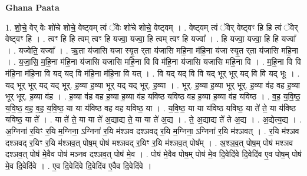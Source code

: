 \documentclass[17pt]{extarticle}
\begin{document}
\textbf{Ghana Paata } \newline

1. शो॒चे॒ वेर् वेः शो॑चे शोचे॒ वेष्ट्वम् त्वं ॅवेः शो॑चे शोचे॒ वेष्ट्वम् । . वेष्ट्वम् त्वं ॅवेर् वेष्ट्वꣳ हि हि त्वं ॅवेर् वेष्ट्वꣳ हि । . त्वꣳ हि हि त्वम् त्वꣳ हि यज्वा॒ यज्वा॒ हि त्वम् त्वꣳ हि यज्वा᳚ । . हि यज्वा॒ यज्वा॒ हि हि यज्वा᳚ । . यज्वेति॒ यज्वा᳚ । . ऋ॒ता य॑जासि यजा स्यृ॒त र्‌ता य॑जासि महि॒ना म॑हि॒ना य॑जा स्यृ॒त र्‌ता य॑जासि महि॒ना । . य॒जा॒सि॒ म॒हि॒ना म॑हि॒ना य॑जासि यजासि महि॒ना वि वि म॑हि॒ना य॑जासि यजासि महि॒ना वि । . म॒हि॒ना वि वि म॑हि॒ना म॑हि॒ना वि यद् यद् वि म॑हि॒ना म॑हि॒ना वि यत् । . वि यद् यद् वि वि यद् भूर् भूर् यद् वि वि यद् भूः । . यद् भूर् भूर् यद् यद् भूर्. ह॒व्या ह॒व्या भूर् यद् यद् भूर्. ह॒व्या । . भूर्. ह॒व्या ह॒व्या भूर् भूर्. ह॒व्या व॑ह वह ह॒व्या भूर् भूर्. ह॒व्या व॑ह । . ह॒व्या व॑ह वह ह॒व्या ह॒व्या व॑ह यविष्ठ यविष्ठ वह ह॒व्या ह॒व्या व॑ह यविष्ठ । . व॒ह॒ य॒वि॒ष्ठ॒ य॒वि॒ष्ठ॒ व॒ह॒ व॒ह॒ य॒वि॒ष्ठ॒ या या य॑विष्ठ वह वह यविष्ठ॒ या । . य॒वि॒ष्ठ॒ या या य॑विष्ठ यविष्ठ॒ या ते॑ ते॒ या य॑विष्ठ यविष्ठ॒ या ते᳚ । . या ते॑ ते॒ या या ते॑ अ॒द्याद्य ते॒ या या ते॑ अ॒द्य । . ते॒ अ॒द्याद्य ते॑ ते अ॒द्य । . अ॒द्येत्य॒द्य । . अ॒ग्निना॑ र॒यिꣳ र॒यि म॒ग्निना॒ ऽग्निना॑ र॒यि म॑श्ञव दश्ञवद् र॒यि म॒ग्निना॒ ऽग्निना॑ र॒यि म॑श्ञवत् । . र॒यि म॑श्ञव दश्ञवद् र॒यिꣳ र॒यि म॑श्ञव॒त् पोष॒म् पोष॑ मश्ञवद् र॒यिꣳ र॒यि म॑श्ञव॒त् पोष᳚म् । . अ॒श्ञ॒व॒त् पोष॒म् पोष॑ मश्ञव दश्ञव॒त् पोष॑ मे॒वैव पोष॑ मञ्नव दश्ञव॒त् पोष॑ मे॒व । . पोष॑ मे॒वैव पोष॒म् पोष॑ मे॒व दि॒वेदि॑वे दि॒वेदि॑व ए॒व पोष॒म् पोष॑ मे॒व दि॒वेदि॑वे । . ए॒व दि॒वेदि॑वे दि॒वेदि॑व ए॒वैव दि॒वेदि॑वे । \newline
\end{document}
